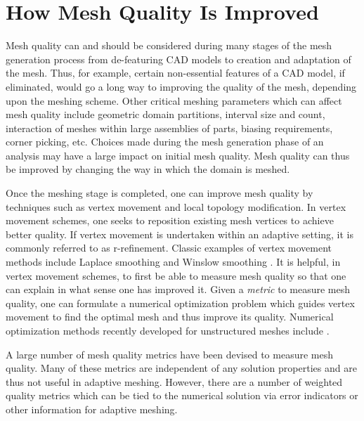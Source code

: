 \section{How Mesh Quality Is Improved}
Mesh quality can and should be considered during many stages of
the mesh generation process from de-featuring CAD models to
creation and adaptation of the mesh. Thus, for example, certain
non-essential features of a CAD model, if eliminated, would go a
long way to improving the quality of the mesh, depending upon
the meshing scheme. Other critical meshing parameters which can
affect mesh quality include geometric domain partitions, interval size
and count, interaction of meshes within large assemblies of parts,
biasing requirements, corner picking, etc. Choices made during the
mesh generation phase of an analysis may have a large impact on
initial mesh quality.  Mesh quality can thus be improved by changing the
way in which the domain is meshed. \newline

Once the meshing stage is completed, one can improve mesh quality
by techniques such as vertex movement and local topology modification.
In vertex movement schemes, one seeks to reposition existing mesh vertices to
achieve better quality. If vertex movement is undertaken within an adaptive
setting, it is commonly referred to as r-refinement.
Classic examples of vertex movement methods
include Laplace smoothing \cite{F88} and Winslow smoothing \cite{Winslow}.
It is helpful, in vertex movement schemes, to first be
able to measure mesh quality so that one can explain in what sense one
has improved it. Given a {\it metric} to measure mesh quality,
one can formulate a numerical
optimization problem which guides vertex movement to find the optimal
mesh and thus improve its quality.  Numerical
optimization methods recently
developed for unstructured meshes include \cite{Opt-MS,Kn00,FrKn01,
FeasNewt,bjoe:swap,bjoe:chain-swap,es92}. \newline

A large number of mesh quality metrics have been devised to measure
mesh quality. Many of these metrics are independent of any solution
properties and are thus not useful in adaptive meshing. However, there
are a number of weighted quality metrics which can be tied to the
numerical solution via error indicators or other information for adaptive
meshing. \newline

